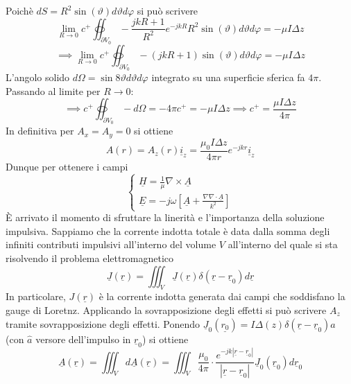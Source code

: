\documentclass{book}
\begin{document}
            Poichè $dS = R^{2}\sin(\vartheta) d \vartheta d \varphi$ si può scrivere
            \begin{equation}
                \lim_{R \to 0} c^{+} \oiint_{\partial V_{0}} - \frac{jkR+1}{R^{2}}e^{-jkR}R^{2}\sin(\vartheta)d\vartheta d \varphi = -\mu I \Delta z
            \end{equation}
            \begin{equation}
                \implies \lim_{R \to 0} c^{+} \oiint_{\partial V_{0}} - (jkR+1)\sin(\vartheta) d \vartheta d \varphi = -\mu I \Delta z
            \end{equation}
            L'angolo solido $d\Omega = \sin8\vartheta d\vartheta d \varphi$ integrato su una superficie sferica fa $4 \pi$. Passando al limite per $R \to 0$:
            \begin{equation}
                \implies c^{+}\oiint_{\partial V_{0}} - d\Omega = -4 \pi c^{+} = - \mu I \Delta z \implies c^{+} = \frac{\mu I \Delta z}{4 \pi}
            \end{equation}
            In definitiva per $A_{x}=A_{y}=0$ si ottiene
            \begin{equation}
                A(r) = A_{z}(r) \underline{i}_{z} = \frac{\mu_{0}I \Delta z}{4 \pi r} e^{-jkr} \underline{i}_{z}
            \end{equation}
            Dunque per ottenere i campi 
            \begin{equation}
                \begin{cases}
                    \underline{H} = \frac{1}{\mu} \nabla \times \underline{A} \\
                    \underline{E} = -j \omega [\underline{A} + \frac{\nabla \nabla \cdot \underline{A}}{k^{2}}]
                \end{cases}
            \end{equation}
            È arrivato il momento di sfruttare la linerità e l'importanza della soluzione impulsiva. Sappiamo che la corrente indotta totale è data dalla somma degli infiniti contributi impulsivi all'interno
            del volume $V$ all'interno del quale si sta risolvendo il problema elettromagnetico 
            \begin{equation}
                \underline{J}(\underline{r}) = \iiint_{V} \underline{J}(\underline{r})\delta(\underline{r}-\underline{r}_{0})d \underline{r}
            \end{equation}
            In particolare, $J(\underline{r})$ è la corrente indotta generata dai campi che soddisfano la gauge di Loretnz. Applicando la sovrapposizione degli effetti si può scrivere $A_{z}$ tramite 
            sovrapposizione degli effetti. Ponendo $\underline{J}_{0}(\underline{r_{0}})=I\Delta(z)\delta(\underline{r}-\underline{r}_{0}) \hat{a}$ (con $\hat{a}$ versore dell'impulso in $\underline{r}_{0}$)
            si ottiene 
            \begin{equation}
                \underline{A}(\underline{r})=\iiint_{V}d\underline{A}(\underline{r}) = \iiint_{V} \frac{\mu_{0}}{4\pi} \cdot \frac{e^{-jk|\underline{r}-\underline{r}_{0}|}}{|\underline{r}-\underline{r}_{0}|}
                \underline{J}_{0}(\underline{r}_{0})d\underline{r}_{0}
            \end{equation}
\end{document}
